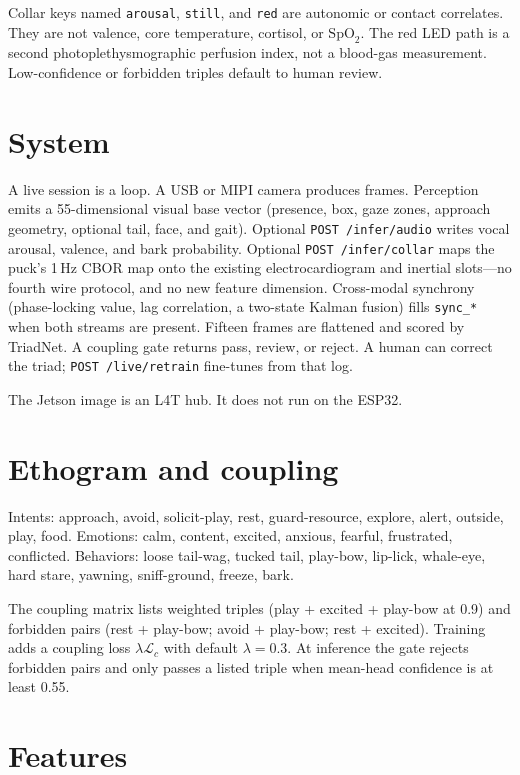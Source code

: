 \documentclass[11pt]{article}
\begin{document}
Collar keys named \texttt{arousal}, \texttt{still}, and \texttt{red} are autonomic or contact correlates.
They are not valence, core temperature, cortisol, or $\mathrm{SpO}_2$.
The red LED path is a second photoplethysmographic perfusion index, not a blood-gas measurement.
Low-confidence or forbidden triples default to human review.

\section{System}

A live session is a loop.
A USB or MIPI camera produces frames.
Perception emits a 55-dimensional visual base vector (presence, box, gaze zones, approach geometry,
optional tail, face, and gait).
Optional \texttt{POST /infer/audio} writes vocal arousal, valence, and bark probability.
Optional \texttt{POST /infer/collar} maps the puck's 1\,Hz CBOR map onto the existing electrocardiogram
and inertial slots---no fourth wire protocol, and no new feature dimension.
Cross-modal synchrony (phase-locking value, lag correlation, a two-state Kalman fusion) fills
\texttt{sync\_*} when both streams are present.
Fifteen frames are flattened and scored by TriadNet.
A coupling gate returns pass, review, or reject.
A human can correct the triad; \texttt{POST /live/retrain} fine-tunes from that log.

The Jetson image is an L4T hub.
It does not run on the ESP32.

\section{Ethogram and coupling}

Intents: approach, avoid, solicit-play, rest, guard-resource, explore, alert, outside, play, food.
Emotions: calm, content, excited, anxious, fearful, frustrated, conflicted.
Behaviors: loose tail-wag, tucked tail, play-bow, lip-lick, whale-eye, hard stare, yawning, sniff-ground, freeze, bark.

The coupling matrix lists weighted triples (play + excited + play-bow at 0.9) and forbidden pairs
(rest + play-bow; avoid + play-bow; rest + excited).
Training adds a coupling loss $\lambda \mathcal{L}_c$ with default $\lambda = 0.3$.
At inference the gate rejects forbidden pairs and only passes a listed triple when mean-head
confidence is at least 0.55.

\section{Features}
\end{document}
